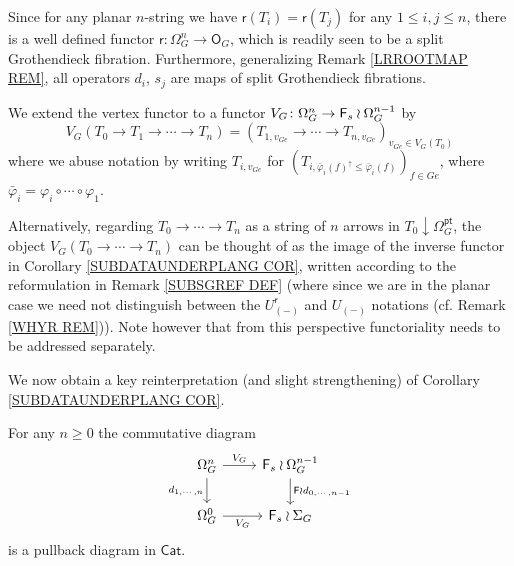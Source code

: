 \documentclass[a4paper,10pt]{article}%
\begin{document}
\begin{remark}\label{ALLSPLITMAPS REM}
Since for any planar $n$-string we have 
$\mathsf{r}(T_i) = \mathsf{r}(T_j)$
for any $1 \leq i,j \leq n$, 
there is a well defined functor
$\mathsf{r} \colon \Omega_{G}^{n} \to \mathsf{O}_G$,
which is readily seen to be a split Grothendieck fibration.
Furthermore, generalizing Remark \ref{LRROOTMAP REM},
all operators $d_i$, $s_j$ 
are maps of split Grothendieck fibrations.
\end{remark}


\begin{notation}\label{VGDEF NOT}
We extend the vertex functor to a functor 
$V_G \colon \Omega_{G}^{n} \to \mathsf{F}_s \wr \Omega_{G}^{n-1}$
by
\begin{equation}\label{VGDEF EQ}
	V_G(T_0 \to T_1 \to \cdots \to T_n) = 
	(T_{1,v_{Ge}} \to \cdots \to
	T_{n,v_{Ge}})_{v_{Ge} \in V_G(T_0)}	
\end{equation}
where we abuse notation by writing $T_{i,v_{Ge}}$
for 
$(T_{i,\bar{\varphi}_i(f)^{\uparrow}\leq \bar{\varphi}_i(f)})_{f \in Ge}$, where 
$\bar{\varphi}_i = \varphi_i \circ \cdots \circ \varphi_1$.

Alternatively, regarding $T_0 \to \cdots \to T_n$ as a string of $n$ arrows in $T_0 \downarrow \Omega_G^{\mathsf{pt}}$, 
the object $V_G(T_0 \to \cdots \to T_n)$
can be thought of as the image of the inverse functor in
Corollary \ref{SUBDATAUNDERPLANG COR},
written according to the reformulation in 
Remark \ref{SUBSGREF DEF}
(where since we are in the planar case we need not distinguish between the
$U_{(\minus)}^{\mathsf{r}}$ and $U_{(\minus)}$ notations
(cf. Remark \ref{WHYR REM})).
Note however that from this perspective
functoriality needs to be addressed separately.
\end{notation}

We now obtain a key reinterpretation (and slight strengthening) of Corollary \ref{SUBDATAUNDERPLANG COR}.


\begin{proposition} \label{SUBSASPULL PROP}
For any $n\geq 0$ the commutative diagram
	\begin{equation}\label{PTPULL EQ}
	\begin{tikzcd}
		\Omega_{G}^{n} \ar{r}{V_G} 
		\ar{d}[swap]{d_{1,\cdots,n}} & \Fin_s \wr \Omega_{G}^{n-1} 
		\ar{d}{\Fin \wr d_{0,\cdots,n-1}}
	\\
		\Omega_{G}^{0} \ar{r}[swap]{V_G} & \Fin_s \wr \Sigma_G
	\end{tikzcd}
	\end{equation}
is a pullback diagram in $\mathsf{Cat}$.
\end{proposition}
\end{document}
